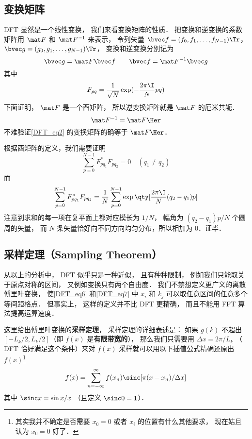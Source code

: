 \subsection{变换矩阵}
DFT 显然是一个线性变换， 我们来看变换矩阵的性质． 把变换和逆变换的系数矩阵用
 $\mat F$ 和 $\mat F^{-1}$ 来表示， 令列矢量 $\bvec f = (f_0,f_1,\dots,f_{N-1})\Tr$， $\bvec g = (g_0,g_1,\dots,g_{N-1})\Tr$， 变换和逆变换分别记为
\begin{equation}
\bvec g = \mat F \bvec f \qquad
\bvec f = \mat F^{-1} \bvec g
\end{equation}
其中
\begin{equation}
F_{pq} = \frac{1}{\sqrt{N}} \exp(-\frac{2\pi\I}{N} p q)
\end{equation}
下面证明， $\mat F$ 是一个酉矩阵， 所以逆变换矩阵就是 $\mat F$ 的厄米共轭．
\begin{equation}
\mat F^{-1} = \mat F\Her
\end{equation}
不难验证\autoref{DFT_eq2} 的变换矩阵的确等于 $\mat F\Her$．

根据酉矩阵的定义，我们需要证明
\begin{equation}
\sum_{p=0}^{N-1} F^*_{pq_1} F_{pq_2} = 0 \quad (q_1 \ne q_2)
\end{equation}
而
\begin{equation}\label{DFT_eq14}
\sum_{p=0}^{N-1} F^*_{pq_1}F_{pq_2}
= \frac1N \sum_{p=0}^{N-1} \exp\qty[\frac{2\pi\I}{N} (q_2-q_1) p]
\end{equation}
注意到求和的每一项在复平面上都对应模长为 $1/N$， 幅角为 $(q_2-q_1)p/N$ 个圆周的矢量，
而 $N$ 条矢量恰好向不同方向均匀分布，所以相加为 $0$．证毕．

\subsection{采样定理（Sampling Theorem）}
从以上的分析中， DFT 似乎只是一种近似， 且有种种限制， 例如我们只能取关于原点对称的区间， 又例如变换只有两个自由度． 我们不禁想定义更广义的离散傅里叶变换， 使\autoref{DFT_eq6} 和\autoref{DFT_eq7} 中 $x_i$ 和 $k_j$ 可以取任意区间的任意多个等间距格点． 但事实上， 这样的定义并不比 DFT 更精确， 而且不能用 FFT 算法提高运算速度．

这里给出傅里叶变换的\textbf{采样定理}， 采样定理的详细表述是： 如果 $g(k)$ 不超出 $[-L_k/2, L_k/2]$（即 $f(x)$ 是\textbf{有限带宽的}）， 那么我们只需要用 $\Delta x = 2\pi/L_k$ （ DFT 恰好满足这个条件）来对  $f(x)$  采样就可以用以下插值公式精确还原出 $f(x)$\footnote{其实我并不确定是否需要 $x_0 = 0$ 或者 $x_i$ 的位置有什么其他要求， 现在姑且认为 $x_0 = 0$ 好了．}
\begin{equation}\label{DFT_eq15}
f(x) = \sum_{n = -\infty}^{\infty} f(x_n)\sinc[\pi(x - x_n)/\Delta x]
\end{equation}
其中 $\sinc x = \sin x/x$ （且定义 $\sinc 0 = 1$）．

